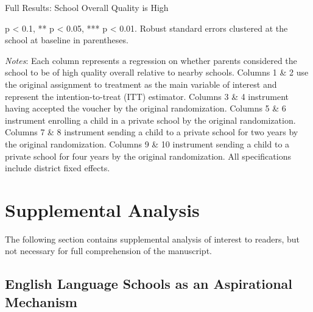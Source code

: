 \documentclass[hidelinks, 12pt, titlepage]{article}
\begin{document}
	\begin{landscape}
		\begin{table}
			\begin{threeparttable}
				\centering
				\caption{Full Results: School Overall Quality is High\label{table:appendixschooloverallquality}}
				
				\begin{tablenotes}
					\item * p < 0.1, ** p < 0.05, *** p < 0.01. Robust standard errors clustered at the school at baseline in parentheses.
					\item \emph{Notes}: Each column represents a regression on whether parents considered the school to be of high quality overall relative to nearby schools.   Columns 1 \& 2 use the original assignment to treatment as the main variable of interest and represent the intention-to-treat (ITT) estimator.  Columns 3 \& 4 instrument having accepted the voucher by the original randomization.  Columns 5 \& 6 instrument enrolling a child in a private school by the original randomization.  Columns 7 \& 8 instrument sending a child to a private school for two years by the original randomization.  Columns 9 \& 10 instrument sending a child to a private school for four years by the original randomization.  All specifications include district fixed effects.
				\end{tablenotes}
			\end{threeparttable}
		\end{table}
	\end{landscape}

\clearpage
{}%
\renewcommand*{\thepage}{\thesection\arabic{page}}
\renewcommand\thefigure{\thesection\arabic{figure}}
\renewcommand\thetable{\thesection\arabic{table}}
\setcounter{figure}{0}
\setcounter{table}{0}

\section{Supplemental Analysis}

	The following section contains supplemental analysis of interest to readers, but not necessary for full comprehension of the manuscript.

	\subsection{English Language Schools as an Aspirational Mechanism}
\end{document}
